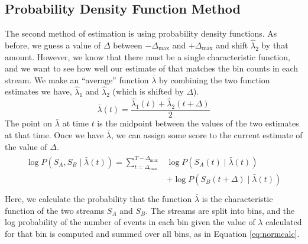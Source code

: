 \documentclass[a4paper,11pt]{article}
\begin{document}
\subsection{Probability Density Function Method}
\label{sec-5-2}

   The second method of estimation is using probability density functions. As
   before, we guess a value of $\Delta$ between $-\Delta_{\text{max}}$ and
   $+\Delta_{\text{max}}$ and shift $\hat{\lambda}_2$ by that amount. However,
   we know that there must be a single characteristic function, and we want to
   see how well our estimate of that matches the bin counts in each stream. We
   make an ``average'' function $\bar{\lambda}$ by combining the two function
   estimates we have, $\hat{\lambda}_1$ and $\hat{\lambda}_2$ (which is shifted
   by $\Delta$).
   \begin{equation}
   \bar{\lambda}(t)=\frac{\hat{\lambda}_1(t)+\hat{\lambda}_2(t+\Delta)}{2}
   \end{equation}
   The point on $\bar{\lambda}$ at time $t$ is the midpoint between the values of
   the two estimates at that time. Once we have $\bar{\lambda}$, we can assign some
   score to the current estimate of the value of $\Delta$.
   \begin{align}
   \begin{split}
   \log P(S_A,S_B\mid\bar{\lambda}(t))=\sum_{t=\Delta_{\text{max}}}^{T-\Delta_{\text{max}}}&\log P(S_A(t)\mid \bar{\lambda}(t))\\
   &+ \log P(S_B(t+\Delta)\mid \bar{\lambda}(t))\\
   \end{split}
   \end{align}
   Here, we calculate the probability that the function $\bar{\lambda}$ is the
   characteristic function of the two streams $S_A$ and $S_B$. The streams are
   split into bins, and the log probability of the number of events in each bin
   given the value of $\lambda$ calculated for that bin is computed and summed
   over all bins, as in Equation \eqref{eq:normcalc}.
\end{document}
